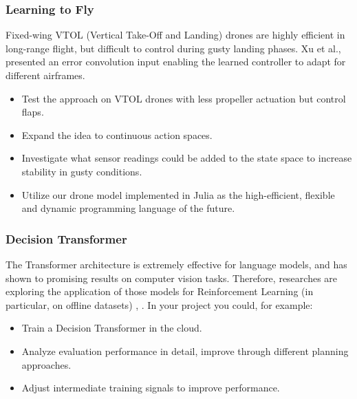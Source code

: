 \documentclass[a4paper]{article}
\begin{document}
\subsubsection{Learning to Fly}
Fixed-wing VTOL (Vertical Take-Off and Landing) drones are highly efficient in long-range flight, but difficult to control during gusty landing phases. Xu et al., \cite{LearningToFly} presented an error convolution input enabling the learned controller to adapt for different airframes.
\begin{itemize}
  \item Test the approach on VTOL drones with less propeller actuation but control flaps.
  \item Expand the idea to continuous action spaces.
  \item Investigate what sensor readings could be added to the state space to increase stability in gusty conditions.
  \item Utilize our drone model \cite{BionicVTOL} implemented in Julia as the high-efficient, flexible and dynamic programming language of the future.
\end{itemize}


\subsubsection{Decision Transformer}
The Transformer architecture is extremely effective for language models, and has shown to promising results on computer vision tasks.
Therefore, researches are exploring the application of those models for Reinforcement Learning (in particular, on offline datasets) \cite{DecisionTransformer2021}, \cite{OneBigSequence2021}. In your project you could, for example:
\begin{itemize}
  \item Train a Decision Transformer in the cloud.
  \item Analyze evaluation performance in detail, improve through different planning approaches.
  \item Adjust intermediate training signals to improve performance.
\end{itemize}

\end{document}

